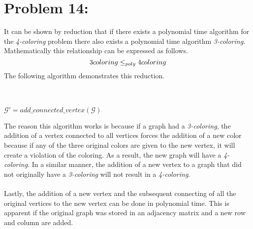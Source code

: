\documentclass[12pt]{article}
\begin{document}
\section*{Problem 14:}
It can be shown by reduction that if there exists a polynomial time algorithm
for the \textit{4-coloring} problem there also exists a polynomial time algorithm
\textit{3-coloring}.  Mathematically this relationship can be expressed as follows.
\[
3\-coloring \leq_{poly} 4\-coloring
\]
The following algorithm demonstrates this reduction.\\
\begin{algorithm}[H]
\\
\\
$\mathcal{G'}=add\_connected\_vertex(\mathcal{G})$\\
\end{algorithm}
The reason this algorithm works is because if a graph had a \textit{3-coloring}, the
addition of a vertex connected to all vertices forces the addition of a new color because
if any of the three original colors are given to the new vertex, it will create a
violation of the coloring.  As a result, the new graph will have a \textit{4-coloring}.
In a similar manner, the addition of a new vertex to a graph that did not originally
have a \textit{3-coloring} will not result in a \textit{4-coloring}.\\\\
Lastly, the addition of a new vertex and the subsequent connecting of all the original
vertices to the new vertex can be done in polynomial time.  This is apparent if the 
original graph was stored in an adjacency matrix and a new row and column are added.
\end{document}
